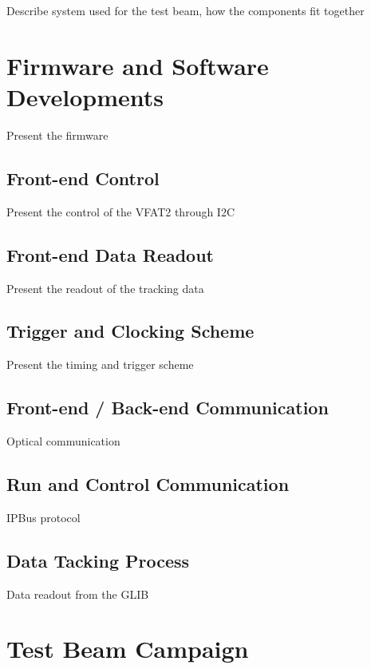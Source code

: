         Describe system used for the test beam, how the components fit together

    \section{Firmware and Software Developments}

        Present the firmware

        \subsection{Front-end Control}

            Present the control of the VFAT2 through I2C

        \subsection{Front-end Data Readout}

            Present the readout of the tracking data

        \subsection{Trigger and Clocking Scheme}

            Present the timing and trigger scheme

        \subsection{Front-end / Back-end Communication}

            Optical communication

        \subsection{Run and Control Communication}

            IPBus protocol

        \subsection{Data Tacking Process}

            Data readout from the GLIB

    \section{Test Beam Campaign}


